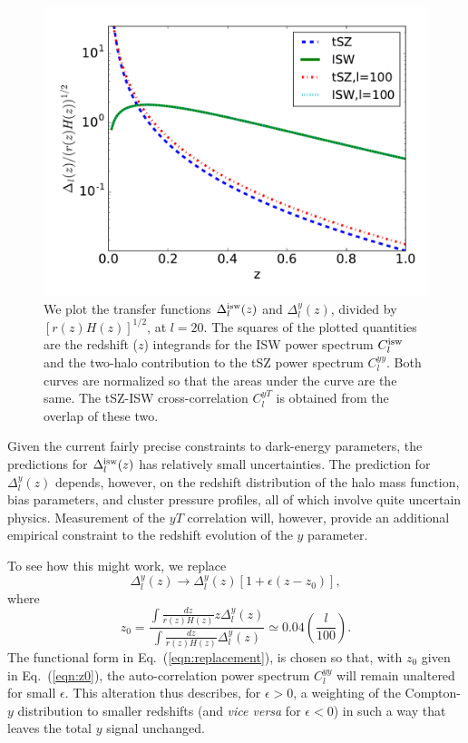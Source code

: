 \documentclass[aps,twocolumn,floats,prd,nofootinbib]{revtex4-1}
\begin{document}
\begin{figure}[h]
\includegraphics[width=10 cm, height = 7 cm]{redshift.pdf}
\caption{We plot the transfer functions $\Delta_l^{\rm isw}(z)$
     and $\Delta_l^y(z)$, divided by $[r(z)H(z)]^{1/2}$, at $l=20$. The
     squares of the plotted quantities are the redshift ($z$)
     integrands for the ISW power spectrum $C_l^{\rm isw}$ and
     the two-halo contribution to the tSZ power spectrum
     $C_l^{yy}$.  Both curves are normalized so that the
     areas under the curve are the same.  The tSZ-ISW
     cross-correlation $C_l^{yT}$ is obtained from the overlap
     of these two.}
\label{fig:Deltas}
\end{figure}






Given the current fairly precise constraints to dark-energy
parameters, the predictions for $\Delta_l^{\rm isw}(z)$ has
relatively small uncertainties.  The prediction for
$\Delta_l^y(z)$ depends, however, on the redshift distribution
of the halo mass function, bias parameters, and cluster pressure
profiles, all of which involve quite uncertain physics.
Measurement of the $yT$ correlation will, however, provide an
additional empirical constraint to the redshift evolution of the
$y$ parameter.

To see how this might work, we replace
\begin{equation}
     \Delta_l^y(z) \to \Delta_l^y(z) \left[ 1 +
     \epsilon (z-z_0) \right],
\label{eqn:replacement}
\end{equation}
where
\begin{equation}
     z_0 = \frac{ \int \frac{dz}{r(z)H(z)} z \Delta_l^y(z)}
     { \int \frac{dz}{r(z)H(z)} \Delta_l^y(z)} \simeq 0.04\left(\frac{l}{100}\right).
\label{eqn:z0}     
\end{equation}
The functional form in Eq.~(\ref{eqn:replacement}), is chosen so
that, with $z_0$ given in Eq.~(\ref{eqn:z0}), the
auto-correlation power spectrum $C_l^{yy}$ will remain unaltered
for small $\epsilon$.  This alteration thus describes, for
$\epsilon>0$, a weighting of the Compton-$y$ distribution to
smaller redshifts (and {\it vice versa} for $\epsilon<0$) in
such a way that leaves the total $y$ signal unchanged.
\end{document}
